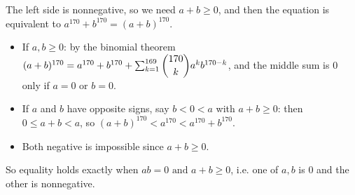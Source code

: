 The left side is nonnegative, so we need $a+b\ge0$, and then the equation is equivalent to $a^{170}+b^{170}=(a+b)^{170}$.
\begin{itemize}
\item If $a,b\ge0$: by the binomial theorem $(a+b)^{170}=a^{170}+b^{170}+\sum_{k=1}^{169}\dbinom{170}{k}a^kb^{170-k}$, and the middle sum is $0$ only if $a=0$ or $b=0$.
\item If $a$ and $b$ have opposite signs, say $b<0<a$ with $a+b\ge0$: then $0\le a+b<a$, so $(a+b)^{170}<a^{170}<a^{170}+b^{170}$.
\item Both negative is impossible since $a+b\ge0$.
\end{itemize}
So equality holds exactly when $\boxed{ab=0\text{ and }a+b\ge0}$, i.e. one of $a,b$ is $0$ and the other is nonnegative.
